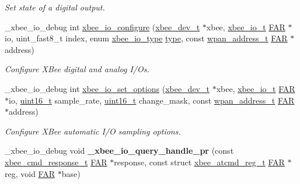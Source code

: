 \begin{DoxyCompactItemize}
\begin{DoxyCompactList}\small\item\em Set state of a digital output. \end{DoxyCompactList}\item 
\-\_\-xbee\-\_\-io\-\_\-debug int \hyperlink{group__xbee__io_ga0734acd149ca45fa8041d426f552e51a}{xbee\-\_\-io\-\_\-configure} (\hyperlink{structxbee__dev__t}{xbee\-\_\-dev\-\_\-t} $\ast$xbee, \hyperlink{structxbee__io__t}{xbee\-\_\-io\-\_\-t} \hyperlink{group__hal_gaef060b3456fdcc093a7210a762d5f2ed}{F\-A\-R} $\ast$io, uint\-\_\-fast8\-\_\-t index, enum \hyperlink{group__xbee__io_gac23a55c53310f865d9ed2381e331a438}{xbee\-\_\-io\-\_\-type} \hyperlink{group__zcl_ga1d127017fb298b889f4ba24752d08b8e}{type}, const \hyperlink{structwpan__address__t}{wpan\-\_\-address\-\_\-t} \hyperlink{group__hal_gaef060b3456fdcc093a7210a762d5f2ed}{F\-A\-R} $\ast$address)
\begin{DoxyCompactList}\small\item\em Configure X\-Bee digital and analog I/\-Os. \end{DoxyCompactList}\item 
\-\_\-xbee\-\_\-io\-\_\-debug int \hyperlink{group__xbee__io_ga6a1e9ccca3a6d97f1b583e76f1193dca}{xbee\-\_\-io\-\_\-set\-\_\-options} (\hyperlink{structxbee__dev__t}{xbee\-\_\-dev\-\_\-t} $\ast$xbee, \hyperlink{structxbee__io__t}{xbee\-\_\-io\-\_\-t} \hyperlink{group__hal_gaef060b3456fdcc093a7210a762d5f2ed}{F\-A\-R} $\ast$io, \hyperlink{group__hal_ga5a8b2dc9e45a9ee81a94ef304fb62505}{uint16\-\_\-t} sample\-\_\-rate, \hyperlink{group__hal_ga5a8b2dc9e45a9ee81a94ef304fb62505}{uint16\-\_\-t} change\-\_\-mask, const \hyperlink{structwpan__address__t}{wpan\-\_\-address\-\_\-t} \hyperlink{group__hal_gaef060b3456fdcc093a7210a762d5f2ed}{F\-A\-R} $\ast$address)
\begin{DoxyCompactList}\small\item\em Configure X\-Bee automatic I/\-O sampling options. \end{DoxyCompactList}\item 
\hypertarget{group__xbee__io_gaa65c33f5a2ca49785dafc0b2408e0d2c}{\-\_\-xbee\-\_\-io\-\_\-debug void {\bfseries \-\_\-xbee\-\_\-io\-\_\-query\-\_\-handle\-\_\-pr} (const \hyperlink{structxbee__cmd__response__t}{xbee\-\_\-cmd\-\_\-response\-\_\-t} \hyperlink{group__hal_gaef060b3456fdcc093a7210a762d5f2ed}{F\-A\-R} $\ast$response, const struct \hyperlink{structxbee__atcmd__reg__t}{xbee\-\_\-atcmd\-\_\-reg\-\_\-t} \hyperlink{group__hal_gaef060b3456fdcc093a7210a762d5f2ed}{F\-A\-R} $\ast$reg, void \hyperlink{group__hal_gaef060b3456fdcc093a7210a762d5f2ed}{F\-A\-R} $\ast$base)}\label{group__xbee__io_gaa65c33f5a2ca49785dafc0b2408e0d2c}


\end{DoxyCompactItemize}
